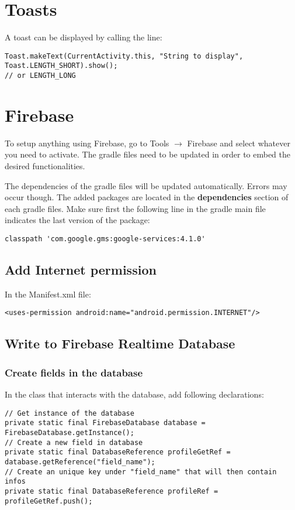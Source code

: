 \documentclass[11pt]{article}
\begin{document}
\section{Toasts}
A toast can be displayed by calling the line:
\lstset{language = Java}
\begin{lstlisting}
Toast.makeText(CurrentActivity.this, "String to display", Toast.LENGTH_SHORT).show();
// or LENGTH_LONG
\end{lstlisting}



\section{Firebase}
To setup anything using Firebase, go to Tools $\rightarrow$ Firebase and select whatever you need to activate. The gradle files need to be updated in order to embed the desired functionalities. 

The dependencies of the gradle files will be updated automatically. Errors may occur though. The added packages are located in the \textbf{dependencies} section of each gradle files. 
Make sure first the following line in the gradle main file indicates the last version of the package:
\lstset{language = XML}
\begin{lstlisting}
classpath 'com.google.gms:google-services:4.1.0'
\end{lstlisting}

\subsection{Add Internet permission}
In the Manifest.xml file:
\lstset{language = XML}
\begin{lstlisting}
<uses-permission android:name="android.permission.INTERNET"/>
\end{lstlisting}

\subsection{Write to Firebase Realtime Database}
\subsubsection{Create fields in the database}
In the class that interacts with the database, add following declarations: 
\lstset{language = Java}
\begin{lstlisting}
// Get instance of the database
private static final FirebaseDatabase database = FirebaseDatabase.getInstance();
// Create a new field in database
private static final DatabaseReference profileGetRef = database.getReference("field_name");
// Create an unique key under "field_name" that will then contain infos 
private static final DatabaseReference profileRef = profileGetRef.push();
\end{lstlisting}
\end{document}
